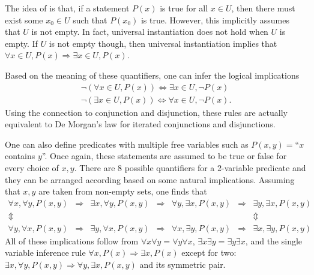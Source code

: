 The idea of  is that, if a statement $P(x)$ is true for all $x\in U$, then there must exist some $x_0 \in U$ such that $P(x_0)$ is true.
However, this implicitly assumes that $U$ is not empty.
In fact, universal instantiation does not hold when $U$ is empty.
If $U$ is not empty though, then universal instantiation implies that $\forall x\in U, P(x) \Rightarrow \exists x\in U, P(x)$.


Based on the meaning of these quantifiers, one can infer the logical implications
\begin{gather*}
\neg \left( \forall x \in U, P(x) \right)
\Leftrightarrow \exists x \in U, \neg P(x) \\
\neg \left( \exists x \in U,  P(x) \right)
\Leftrightarrow \forall x \in U,  \neg P(x) .
\end{gather*}
Using the connection to conjunction and disjunction, these rules are actually equivalent to De Morgan's law for iterated conjunctions and disjunctions.


One can also define predicates with multiple free variables such as $P(x,y)=$``$x$ contains $y$''.
Once again, these statements are assumed to be true or false for every choice of $x,y$.
There are 8 possible quantifiers for a 2-variable predicate and they can be arranged according based on some natural implications.
Assuming that $x,y$ are taken from non-empty sets, one finds that
\[ \begin{array}{ccccccc}
  \forall x, \forall y, P(x,y) & \Rightarrow & \exists x, \forall y, P(x,y) & \Rightarrow & \forall y, \exists x, P(x,y) & \Rightarrow & \exists y, \exists x, P(x,y) \\
  \Updownarrow &&&&&& \Updownarrow \\
  \forall y, \forall x, P(x,y) & \Rightarrow & \exists y, \forall x, P(x,y) & \Rightarrow & \forall x, \exists y, P(x,y) & \Rightarrow & \exists x, \exists y, P(x,y)
  \end{array}
\]
All of these implications follow from $\forall x \forall y = \forall y \forall x$, $\exists x \exists y = \exists y \exists x$, and the single variable inference rule $\forall x, P(x) \Rightarrow \exists x, P(x)$ except for two: $\exists x, \forall y, P(x,y) \Rightarrow \forall y, \exists x, P(x,y)$ and its symmetric pair.

